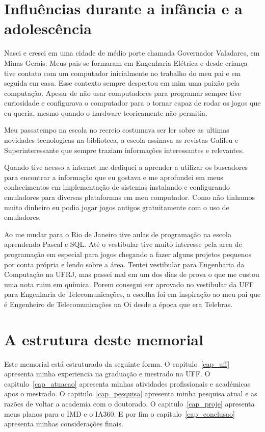 \documentclass[10pt,a4paper,oneside]{book}
\begin{document}
\section{Influências durante a infância e a adolescência}
Nasci e cresci em uma cidade de médio porte chamada Governador Valadares, em Minas Gerais. 
Meus pais se formaram em Engenharia Elétrica e desde criança tive contato com um computador 
inicialmente no trabalho do meu pai e em seguida em casa. Esse contexto sempre despertou em mim
uma paixão pela computação. Apesar de não usar computadores para programar sempre
tive curiosidade e configurava o computador para o tornar capaz de rodar os jogos que eu queria, mesmo quando o
hardware teoricamente não permitia.

Meu passatempo na escola no recreio costumava ser ler sobre as ultimas novidades
tecnologicas na biblioteca, a escola assinava as  revistas Galileu e Superinteressante que sempre traziam informações
interessantes e relevantes.

Quando tive acesso a internet me dediquei a aprender a utilizar os buscadores para encontrar 
a informação que eu gostava e me aprofundei em meus conhecimentos em implementação de sistemas
instalando e configurando emuladores para diversas plataformas em meu computador. Como não tinhamos
muito dinheiro eu podia jogar jogos antigos gratuitamente com o uso de emuladores.

Ao me mudar para o Rio de Janeiro tive aulas de programação na escola aprendendo Pascal e SQL. 
Até o vestibular tive muito interesse pela area de programação em especial para jogos chegando a 
fazer alguns projetos pequenos por conta própria e lendo sobre a área. Tentei vestibular para Engenharia da Computação
na UFRJ, mas passei mal em um dos dias de prova o que me custou uma nota ruim em química. Porem consegui ser aprovado
no vestibular da UFF para Engenharia de Telecomunicações, a escolha foi em inspiração ao meu pai que 
é Engenheiro de Telecomunicações na Oi desde a época que era Telebras.


\section{A estrutura deste memorial}

Este memorial está estruturado da seguinte forma. O capitulo~\ref{cap_uff} apresenta minha 
experiencia na graduação e mestrado na UFF. O capitulo~\ref{cap_atuacao} apresenta minhas atividades 
profissionais e académicas apos o mestrado. O capitulo~\ref{cap_pesquisa} apresenta minha pesquisa
atual e as razões de voltar a academia com o doutorado. O capitulo~\ref{cap_proje} apresenta
meus planos para o IMD e o IA360. E por fim o capitulo~\ref{cap_conclusao} apresenta minhas 
considerações finais.
\end{document}

